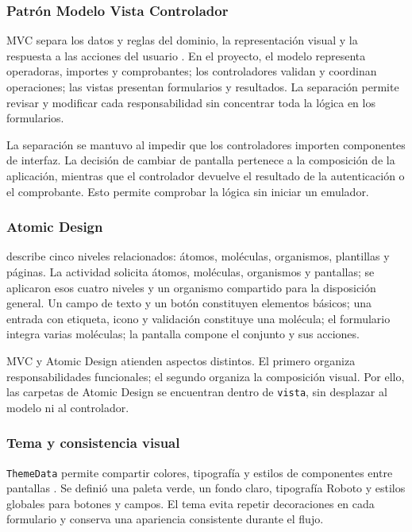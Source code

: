 \documentclass[12pt,letterpaper]{article}
\begin{document}
\subsubsection{Patrón Modelo Vista Controlador}
MVC separa los datos y reglas del dominio, la representación visual y la respuesta a las acciones del usuario \citep{mdnmvc}. En el proyecto, el modelo representa operadoras, importes y comprobantes; los controladores validan y coordinan operaciones; las vistas presentan formularios y resultados. La separación permite revisar y modificar cada responsabilidad sin concentrar toda la lógica en los formularios.

La separación se mantuvo al impedir que los controladores importen componentes de interfaz. La decisión de cambiar de pantalla pertenece a la composición de la aplicación, mientras que el controlador devuelve el resultado de la autenticación o el comprobante. Esto permite comprobar la lógica sin iniciar un emulador.

\subsubsection{Atomic Design}
\citet{frost} describe cinco niveles relacionados: átomos, moléculas, organismos, plantillas y páginas. La actividad solicita átomos, moléculas, organismos y pantallas; se aplicaron esos cuatro niveles y un organismo compartido para la disposición general. Un campo de texto y un botón constituyen elementos básicos; una entrada con etiqueta, icono y validación constituye una molécula; el formulario integra varias moléculas; la pantalla compone el conjunto y sus acciones.

MVC y Atomic Design atienden aspectos distintos. El primero organiza responsabilidades funcionales; el segundo organiza la composición visual. Por ello, las carpetas de Atomic Design se encuentran dentro de \texttt{vista}, sin desplazar al modelo ni al controlador.

\subsubsection{Tema y consistencia visual}
\texttt{ThemeData} permite compartir colores, tipografía y estilos de componentes entre pantallas \citep{fluttertema}. Se definió una paleta verde, un fondo claro, tipografía Roboto y estilos globales para botones y campos. El tema evita repetir decoraciones en cada formulario y conserva una apariencia consistente durante el flujo.
\end{document}

